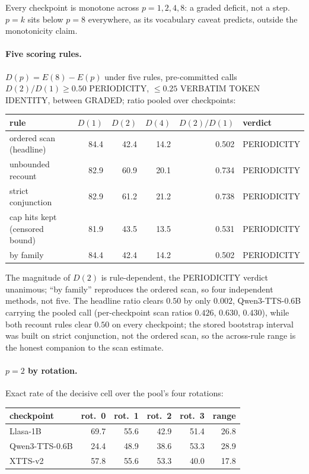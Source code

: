\noindent Every checkpoint is monotone across $p=1,2,4,8$: a graded
deficit, not a step. $p{=}k$ sits below $p{=}8$ everywhere, as its
vocabulary caveat predicts, outside the monotonicity claim.

\paragraph{Five scoring rules.} $D(p)=E(8)-E(p)$ under five rules,
pre-committed calls $D(2)/D(1)\ge0.50$ PERIODICITY, $\le0.25$ VERBATIM
TOKEN IDENTITY, between GRADED; ratio pooled over checkpoints:

\begin{center}
\begin{tabular}{@{}lrrrrl@{}}
\toprule
rule & $D(1)$ & $D(2)$ & $D(4)$ & $D(2)/D(1)$ & verdict \\
\midrule
ordered scan (headline)     & 84.4 & 42.4 & 14.2 & 0.502 & PERIODICITY \\
unbounded recount           & 82.9 & 60.9 & 20.1 & 0.734 & PERIODICITY \\
strict conjunction          & 82.9 & 61.2 & 21.2 & 0.738 & PERIODICITY \\
cap hits kept (censored bound) & 81.9 & 43.5 & 13.5 & 0.531 & PERIODICITY \\
by family                   & 84.4 & 42.4 & 14.2 & 0.502 & PERIODICITY \\
\bottomrule
\end{tabular}
\end{center}

\noindent The magnitude of $D(2)$ is rule-dependent, the PERIODICITY
verdict unanimous; ``by family'' reproduces the ordered scan, so four
independent methods, not five. The headline ratio clears $0.50$ by
only $0.002$, Qwen3-TTS-0.6B carrying the pooled call (per-checkpoint
scan ratios $0.426$, $0.630$, $0.430$), while both recount rules clear
$0.50$ on every checkpoint; the stored bootstrap interval was built on
strict conjunction, not the ordered scan, so the across-rule range is
the honest companion to the scan estimate.

\paragraph{$p{=}2$ by rotation.} Exact rate of the decisive cell over
the pool's four rotations:

\begin{center}
\begin{tabular}{@{}lrrrrr@{}}
\toprule
checkpoint & rot.\ 0 & rot.\ 1 & rot.\ 2 & rot.\ 3 & range \\
\midrule
Llasa-1B         & 69.7 & 55.6 & 42.9 & 51.4 & 26.8 \\
Qwen3-TTS-0.6B   & 24.4 & 48.9 & 38.6 & 53.3 & 28.9 \\
XTTS-v2          & 57.8 & 55.6 & 53.3 & 40.0 & 17.8 \\
\bottomrule
\end{tabular}
\end{center}

